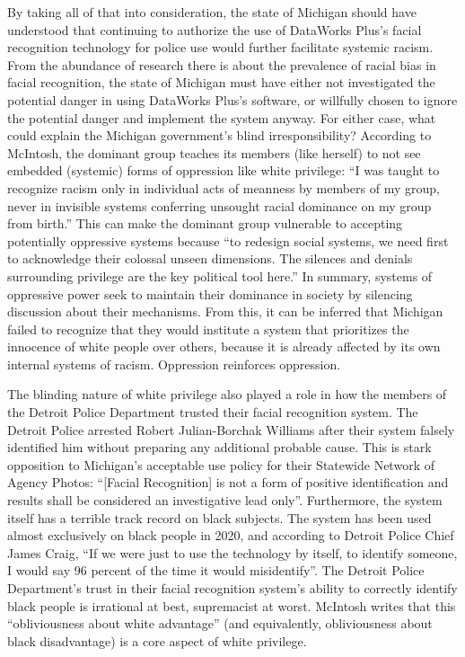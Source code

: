 \documentclass[12pt, letterpaper]{article}
\begin{document}
\begin{mla}
By taking all of that into consideration, the state of Michigan should have
understood that continuing to authorize the use of DataWorks Plus's facial
recognition technology for police use would further facilitate systemic
racism. From the abundance of research there is about the prevalence of racial
bias in facial recognition, the state of Michigan must have either not
investigated the potential danger in using DataWorks Plus's software, or
willfully chosen to ignore the potential danger and implement the system
anyway. For either case, what could explain the Michigan government's blind
irresponsibility? According to McIntosh, the dominant group teaches its
members (like herself) to not see embedded (systemic) forms of oppression like
white privilege: ``I was taught to recognize racism only in individual acts of
meanness by members of my group, never in invisible systems conferring
unsought racial dominance on my group from birth.'' This can make the dominant
group vulnerable to accepting potentially oppressive systems because ``to
redesign social systems, we need first to acknowledge their colossal unseen
dimensions. The silences and denials surrounding privilege are the key
political tool here.'' In summary, systems of oppressive power seek to
maintain their dominance in society by silencing discussion about their
mechanisms. From this, it can be inferred that Michigan failed to recognize
that they would institute a system that prioritizes the innocence of white
people over others, because it is already affected by its own internal systems
of racism. Oppression reinforces oppression.

The blinding nature of white privilege also played a role in how the members
of the Detroit Police Department trusted their facial recognition system. The
Detroit Police arrested Robert Julian-Borchak Williams after their system
falsely identified him without preparing any additional probable cause. This
is stark opposition to Michigan's acceptable use policy for their Statewide
Network of Agency Photos: ``[Facial Recognition] is not a form of positive
identification and results shall be considered an investigative lead only''.
Furthermore, the system itself has a terrible track record on black subjects.
The system has been used almost exclusively on black people in 2020, and
according to Detroit Police Chief James Craig, ``If we were just to use the
technology by itself, to identify someone, I would say 96 percent of the time
it would misidentify''. The Detroit Police Department's trust in their facial
recognition system's ability to correctly identify black people is irrational
at best, supremacist at worst. McIntosh writes that this ``obliviousness about
white advantage'' (and equivalently, obliviousness about black disadvantage)
is a core aspect of white privilege.


\end{mla}
\end{document}
